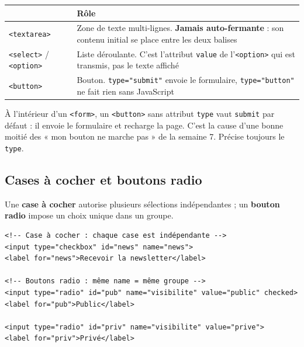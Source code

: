 \documentclass[a4paper,11pt]{article}
\newcommand{\hdr}[1]{\multicolumn{1}{l}{\color{white}\bfseries #1}}
\renewcommand{\arraystretch}{1.3}
\begin{document}
\begin{center}
\renewcommand{\arraystretch}{1.0}
\begin{tabularx}{\linewidth}{p{2.6cm}X}
  \toprule
  \rowcolor{uniNavy}
  \hdr{Balise} & \hdr{Rôle} \\
  \midrule
  \rowcolor{uniPaper}
  \texttt{<textarea>} & Zone de texte multi-lignes. \textbf{Jamais auto-fermante} : son contenu initial se place entre les deux balises \\
  \texttt{<select>} / \texttt{<option>} & Liste déroulante. C'est l'attribut \texttt{value} de l'\texttt{<option>} qui est transmis, pas le texte affiché \\
  \rowcolor{uniPaper}
  \texttt{<button>} & Bouton. \texttt{type="submit"} envoie le formulaire, \texttt{type="button"} ne fait rien sans JavaScript \\
  \bottomrule
\end{tabularx}
\end{center}

\begin{tcolorbox}[attention, title={Le piège du \texttt{<button>} sans \texttt{type}}]
À l'intérieur d'un \texttt{<form>}, un \texttt{<button>} sans attribut \texttt{type} vaut \texttt{submit} par défaut : il envoie le formulaire et recharge la page. C'est la cause d'une bonne moitié des « mon bouton ne marche pas » de la semaine 7. Précise toujours le \texttt{type}.
\end{tcolorbox}

\subsection{Cases à cocher et boutons radio}

Une \textbf{case à cocher} autorise plusieurs sélections indépendantes ; un \textbf{bouton radio} impose un choix unique dans un groupe.

\begin{lstlisting}[language=HTML5, caption={Checkbox et radio}]
<!-- Case à cocher : chaque case est indépendante -->
<input type="checkbox" id="news" name="news">
<label for="news">Recevoir la newsletter</label>

<!-- Boutons radio : même name = même groupe -->
<input type="radio" id="pub" name="visibilite" value="public" checked>
<label for="pub">Public</label>

<input type="radio" id="priv" name="visibilite" value="prive">
<label for="priv">Privé</label>
\end{lstlisting}
\end{document}
